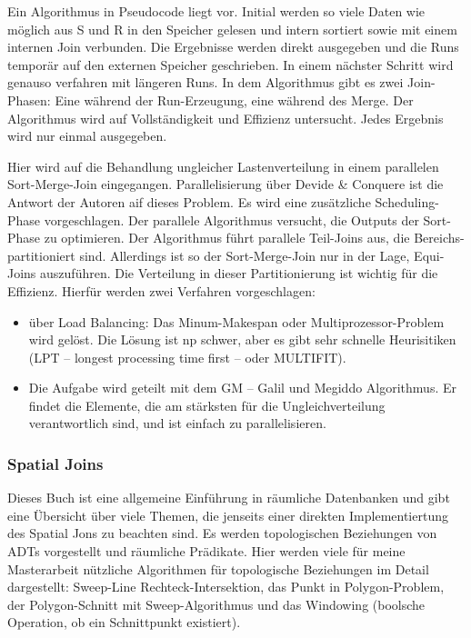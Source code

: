 \documentclass[a4paper,12pt,twoside]{article}
\begin{document}
Ein Algorithmus in Pseudocode liegt vor. Initial werden so viele Daten wie möglich aus S und R in den Speicher gelesen und intern sortiert sowie mit einem internen Join verbunden. Die Ergebnisse werden direkt ausgegeben und die Runs temporär auf den externen Speicher geschrieben. In einem nächster Schritt wird genauso verfahren mit längeren Runs. In dem Algorithmus gibt es zwei Join-Phasen: Eine während der Run-Erzeugung, eine während des Merge. Der Algorithmus wird auf Vollständigkeit und Effizienz untersucht. Jedes Ergebnis wird nur einmal ausgegeben. 

\textbf{}

Hier wird auf die Behandlung ungleicher Lastenverteilung in einem parallelen Sort-Merge-Join eingegangen. Parallelisierung über Devide \& Conquere ist die Antwort der Autoren aif dieses Problem. Es wird eine zusätzliche Scheduling-Phase vorgeschlagen. Der parallele Algorithmus versucht, die Outputs der Sort-Phase zu optimieren. Der Algorithmus führt parallele Teil-Joins aus, die Bereichs-partitioniert sind. Allerdings ist so der Sort-Merge-Join nur in der Lage, Equi-Joins auszuführen. Die Verteilung in dieser Partitionierung ist wichtig für die Effizienz. Hierfür werden zwei Verfahren vorgeschlagen: 

\begin{itemize}
	\item über Load Balancing: Das Minum-Makespan oder Multiprozessor-Problem wird gelöst. Die Lösung ist np schwer, aber es gibt sehr schnelle Heurisitiken (LPT -- longest processing time first -- oder MULTIFIT).
	\item Die Aufgabe wird geteilt mit dem GM -- Galil und Megiddo Algorithmus. Er findet die Elemente, die am stärksten für die Ungleichverteilung verantwortlich sind, und ist einfach zu parallelisieren.
\end{itemize}

\subsubsection{Spatial Joins}

\textbf{}

Dieses Buch ist eine allgemeine Einführung in räumliche Datenbanken und gibt eine Übersicht über viele Themen, die jenseits einer direkten Implementiertung des Spatial Jons zu beachten sind. Es werden topologischen Beziehungen von ADTs vorgestellt und räumliche Prädikate. Hier werden viele für meine Masterarbeit nützliche Algorithmen für topologische Beziehungen im Detail dargestellt: Sweep-Line Rechteck-Intersektion, das Punkt in Polygon-Problem, der Polygon-Schnitt mit Sweep-Algorithmus und das Windowing (boolsche Operation, ob ein Schnittpunkt existiert).
\end{document}
